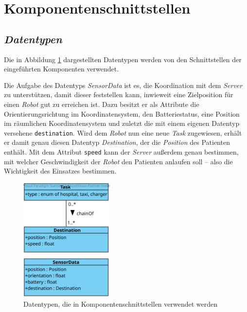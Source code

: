 \section{Komponentenschnittstellen}

\subsection{\textit{Datentypen}}
Die in Abbildung \ref{KomponentenschnittstellenDiagramm} dargestellten Datentypen werden von den Schnittstellen der eingeführten Komponenten verwendet.

Die Aufgabe des Datentyps \emph{SensorData} ist es, die Koordination mit dem \emph{Server} zu unterstützen, damit dieser feststellen kann, inwieweit eine Zielposition für einen \emph{Robot} gut zu erreichen ist. 
Dazu besitzt er als Attribute die Orientierungsrichtung im Koordinatensystem, den Batteriestatus, eine Position im räumlichen Koordinatensystem und zuletzt die mit einem eigenen Datentyp versehene \texttt{destination}. 
Wird dem \emph{Robot} nun eine neue \emph{Task} zugewiesen, erhält er damit genau diesen Datentyp \emph{Destination}, der die \emph{Position} des Patienten enthält. 
Mit dem Attribut \texttt{speed} kann der \emph{Server} außerdem genau bestimmen, mit welcher Geschwindigkeit der \emph{Robot} den Patienten anlaufen soll – also die Wichtigkeit des Einsatzes bestimmen.
\vspace{1cm}

	\begin{figure}[H]
		\centering
		\includegraphics[width=0.42\textwidth]{img/0-Entwurf-3}
		\caption{Datentypen, die in Komponentenschnittstellen verwendet werden}
		\label{KomponentenschnittstellenDiagramm}
	\end{figure}
	\pagebreak


